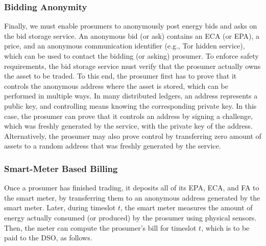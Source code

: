 \subsubsection{Bidding Anonymity}
Finally, we must enable prosumers to anonymously post energy bids and asks on the bid storage service.
An anonymous bid (or ask) contains an ECA (or EPA), a price, and an anonymous communication identifier (e.g., Tor hidden service), which can be used to contact the bidding (or asking) prosumer.
To enforce safety requirements, the bid storage service must verify that the prosumer actually owns the asset to be traded.
To this end, the prosumer first has to prove that it controls the anonymous address where the asset is stored, which can be performed in multiple ways.
In many distributed ledgers, an address represents a public key, and controlling means knowing the corresponding private key.
In this case, the prosumer can prove that it controls an address by signing a challenge, which was freshly generated by the service, with the private key of the address.
Alternatively, the prosumer may also prove control by transferring zero amount of assets to a random address that was freshly generated by the service.


\subsubsection{Smart-Meter Based Billing}
Once a prosumer has finished trading, it deposits all of its EPA, ECA, and FA to the smart meter, by transferring them to an anonymous address generated by the smart meter.
Later, during timeslot $t$, the smart meter measures the amount of energy actually consumed (or produced) by the prosumer using physical sensors.
Then, the meter can compute the prosumer's bill for timeslot $t$, which is to be paid to the DSO, as follows.

